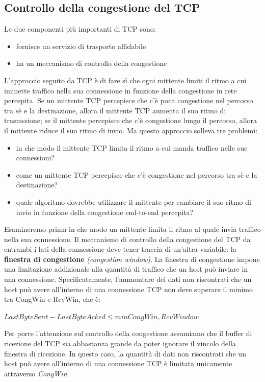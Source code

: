 \documentclass[11pt,a4paper]{article}
\begin{document}
\subsection{Controllo della congestione del TCP}
Le due componenti più importanti di TCP sono:
\begin{itemize}
	\item fornisce un servizio di trasporto affidabile
	\item ha un meccanismo di controllo della congestione
\end{itemize}
L'approccio seguito da TCP è di fare sì che ogni mittente limiti il ritmo a cui immette traffico nella sua connessione in funzione della congestione in rete percepita. Se un mittente TCP percepisce che c'è poca congestione nel percorso tra sè e la destinazione, allora il mittente TCP aumenta il suo ritmo di trasmssione; se il mittente percepisce che c'è congestione lungo il percorso, allora il mittente riduce il suo ritmo di invio. Ma questo approccio solleva tre problemi:
\begin{itemize}
	\item in che modo il mittente TCP limita il ritmo a cui manda traffico nelle sue connessioni?
	\item come un mittente TCP percepisce che c'è congestione nel percorso tra sè e la destinazione?
	\item quale algoritmo dovrebbe utilizzare il mittente per cambiare il suo ritmo di invio in funzione della congestione end-to-end percepita?
\end{itemize}
Esamineremo prima in che modo un mittente limita il ritmo al quale invia traffico nella sua connessione. Il meccanismo di controllo della congestione del TCP da entrambi i lati della connessione deve tener traccia di un'altra variabile: la \textbf{finestra di congestione} \textit{(congestion window)}. La finestra di congestione impone una limitazione addizionale alla quantità di traffico che un host può inviare in una connessione. Specificatamente, l'ammontare dei dati non riscontrati che un host può avere all'interno di una connessione TCP non deve superare il minimo tra CongWin e RcvWin, che è:
\begin{center}
	$LastByteSent - LastByteAcked \leq min{CongWin, RcvWindow}$
\end{center}
Per porre l'attenzione sul controllo della congestione assumiamo che il buffer di ricezione del TCP sia abbastanza grande da poter ignorare il vincolo della finestra di ricezione. In questo caso, la quantità di dati non riscontrati che un host può avere all'interno di una connessione TCP è limitata unicamente attraverso \emph{CongWin}. \\
\end{document}
